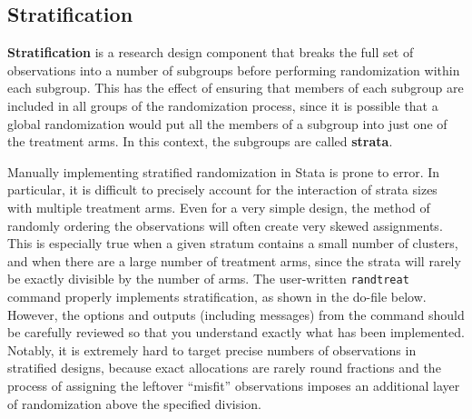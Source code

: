 \subsection{Stratification}

\textbf{Stratification} is a research design component
that breaks the full set of observations into a number of subgroups
before performing randomization within each subgroup.
This has the effect of ensuring that members of each subgroup
are included in all groups of the randomization process,
since it is possible that a global randomization
would put all the members of a subgroup into just one of the treatment arms.
In this context, the subgroups are called \textbf{strata}.

Manually implementing stratified randomization in Stata is prone to error.
In particular, it is difficult to precisely account
for the interaction of strata sizes with multiple treatment arms.
Even for a very simple design, the method of randomly ordering the observations
will often create very skewed assignments.
This is especially true when a given stratum contains a small number of clusters,
and when there are a large number of treatment arms,
since the strata will rarely be exactly divisible by the number of arms.\cite{carril2017dealing}
The user-written \texttt{randtreat} command properly implements stratification, 
as shown in the do-file below. 
However, the options and outputs (including messages) from the command should be carefully reviewed
so that you understand exactly what has been implemented.
Notably, it is extremely hard to target precise numbers of observations
in stratified designs, because exact allocations are rarely round fractions
and the process of assigning the leftover ``misfit'' observations
imposes an additional layer of randomization above the specified division.


